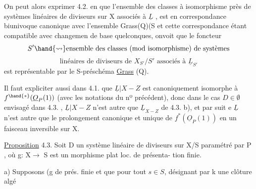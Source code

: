 
On peut alors exprimer 4.2. en  que l'ensemble des classes
à isomorphisme près de systèmes linéaires de diviseurs sur X associés à
$\underline{L}$ , est en correspondance biunivoque canonique avec l'ensemble 
Grass(Q)(S et cette correspondance étant compatible avec  changemen
de base quelconques, onvoit que le foncteur
\[ S' \hand{\rightsquigarrow} \text{ensemble des classes (mod isomorphisme) de systèmes} \]
\[ \text{linéaires de diviseurs de } X_{S'}/S' \text{ associés à } \underline{L}_{S'} \]
est représentable par le S-préschéma \uline{Grass} (Q).



Il faut expliciter aussi dans 4.1. que $\underline{L}|X-Z$ est canoniquement
isomorphe à $f^{\hand{*}}(\underline{O}_P(1))$ (avec les notations du nº précédent), donc dans
le cas $D \in \emptyset$ envisagé dans 4.3. , $\underline{L}|X-Z$ n'est autre que $\underline{L}_{X-Z}$
de 4.3. b), et par suit e $\underline{L}$ n'est autre que le prolongement canonique et
unique de $f^*(\underline{O}_P(1))$ en un faisceau inversible sur X.

\uline{Proposition} 4.3. Soit D un système linéaire de diviseurs sur X/S
paramétré par \hand{$\check{\ }$}P , où g: X$\longrightarrow$ S est  un morphisme plat loc. de présenta-%
tion finie.

a) Supposons (g de prés. finie et que pour tout $s \in S$, désignant par k une clôture algé

